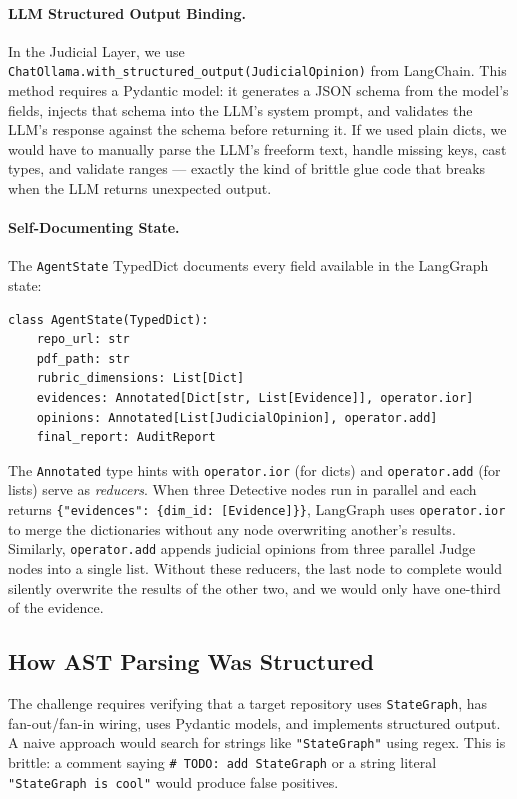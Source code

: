 \documentclass[12pt,a4paper]{article}
\begin{document}
\paragraph{LLM Structured Output Binding.}
In the Judicial Layer, we use \texttt{ChatOllama.with\_structured\_output(JudicialOpinion)} from LangChain. This method requires a Pydantic model: it generates a JSON schema from the model's fields, injects that schema into the LLM's system prompt, and validates the LLM's response against the schema before returning it. If we used plain dicts, we would have to manually parse the LLM's freeform text, handle missing keys, cast types, and validate ranges --- exactly the kind of brittle glue code that breaks when the LLM returns unexpected output.

\paragraph{Self-Documenting State.}
The \texttt{AgentState} TypedDict documents every field available in the LangGraph state:

\begin{lstlisting}[caption={AgentState definition in \texttt{src/state.py}}]
class AgentState(TypedDict):
    repo_url: str
    pdf_path: str
    rubric_dimensions: List[Dict]
    evidences: Annotated[Dict[str, List[Evidence]], operator.ior]
    opinions: Annotated[List[JudicialOpinion], operator.add]
    final_report: AuditReport
\end{lstlisting}

The \texttt{Annotated} type hints with \texttt{operator.ior} (for dicts) and \texttt{operator.add} (for lists) serve as \emph{reducers}. When three Detective nodes run in parallel and each returns \texttt{\{"evidences": \{dim\_id: [Evidence]\}\}}, LangGraph uses \texttt{operator.ior} to merge the dictionaries without any node overwriting another's results. Similarly, \texttt{operator.add} appends judicial opinions from three parallel Judge nodes into a single list. Without these reducers, the last node to complete would silently overwrite the results of the other two, and we would only have one-third of the evidence.


\subsection{How AST Parsing Was Structured}
\label{sec:ast}

The challenge requires verifying that a target repository uses \texttt{StateGraph}, has fan-out/fan-in wiring, uses Pydantic models, and implements structured output. A naive approach would search for strings like \texttt{"StateGraph"} using regex. This is brittle: a comment saying \texttt{\# TODO: add StateGraph} or a string literal \texttt{"StateGraph is cool"} would produce false positives.
\end{document}
